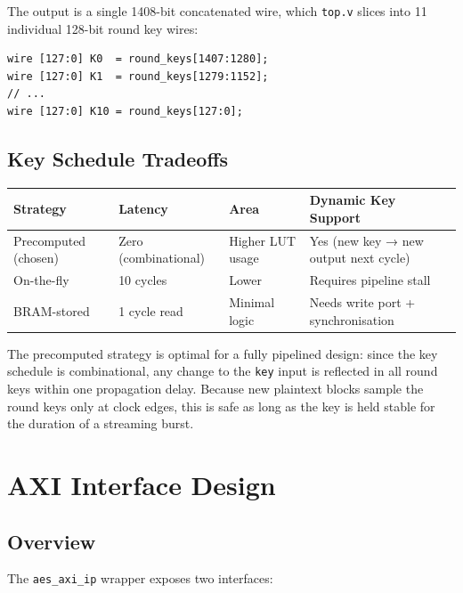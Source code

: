 \documentclass[12pt,a4paper]{article}
\begin{document}
The output is a single 1408-bit concatenated wire, which \texttt{top.v}
slices into 11 individual 128-bit round key wires:

\begin{lstlisting}[caption={Round key slicing in top.v}]
wire [127:0] K0  = round_keys[1407:1280];
wire [127:0] K1  = round_keys[1279:1152];
// ...
wire [127:0] K10 = round_keys[127:0];
\end{lstlisting}

\subsection{Key Schedule Tradeoffs}

\begin{table}[H]
\centering
\begin{tabular}{@{}llll@{}}
\toprule
\textbf{Strategy} & \textbf{Latency} & \textbf{Area} & \textbf{Dynamic Key Support}\\
\midrule
Precomputed (chosen) & Zero (combinational) & Higher LUT usage & Yes (new key → new output next cycle)\\
On-the-fly           & 10 cycles            & Lower           & Requires pipeline stall\\
BRAM-stored          & 1 cycle read         & Minimal logic   & Needs write port + synchronisation\\
\bottomrule
\end{tabular}
\end{table}

The precomputed strategy is optimal for a fully pipelined design: since the
key schedule is combinational, any change to the \texttt{key} input is
reflected in all round keys within one propagation delay. Because new
plaintext blocks sample the round keys only at clock edges, this is safe as
long as the key is held stable for the duration of a streaming burst.

\section{AXI Interface Design}

\subsection{Overview}

The \texttt{aes\_axi\_ip} wrapper exposes two interfaces:
\end{document}
